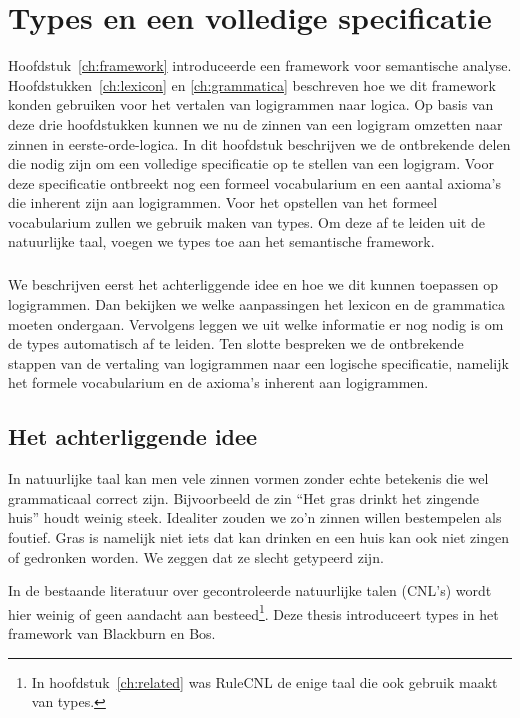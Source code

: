 \chapter{Types en een volledige specificatie}
\label{ch:types}

Hoofdstuk~\ref{ch:framework} introduceerde een framework voor semantische analyse. Hoofdstukken~\ref{ch:lexicon} en \ref{ch:grammatica} beschreven hoe we dit framework konden gebruiken voor het vertalen van logigrammen naar logica. Op basis van deze drie hoofdstukken kunnen we nu de zinnen van een logigram omzetten naar zinnen in eerste-orde-logica. In dit hoofdstuk beschrijven we de ontbrekende delen die nodig zijn om een volledige specificatie op te stellen van een logigram. Voor deze specificatie ontbreekt nog een formeel vocabularium en een aantal axioma's die inherent zijn aan logigrammen. Voor het opstellen van het formeel vocabularium zullen we gebruik maken van types. Om deze af te leiden uit de natuurlijke taal, voegen we types toe aan het semantische framework.

\paragraph{} We beschrijven eerst het achterliggende idee en hoe we dit kunnen toepassen op logigrammen. Dan bekijken we welke aanpassingen het lexicon en de grammatica moeten ondergaan. Vervolgens leggen we uit welke informatie er nog nodig is om de types automatisch af te leiden. Ten slotte bespreken we de ontbrekende stappen van de vertaling van logigrammen naar een logische specificatie, namelijk het formele vocabularium en de axioma's inherent aan logigrammen.

\section{Het achterliggende idee}
In natuurlijke taal kan men vele zinnen vormen zonder echte betekenis die wel grammaticaal correct zijn. Bijvoorbeeld de zin ``Het gras drinkt het zingende huis'' houdt weinig steek. Idealiter zouden we zo'n zinnen willen bestempelen als foutief. Gras is namelijk niet iets dat kan drinken en een huis kan ook niet zingen of gedronken worden. We zeggen dat ze slecht getypeerd zijn.

In de bestaande literatuur over gecontroleerde natuurlijke talen (CNL's) wordt hier weinig of geen aandacht aan besteed\footnote{In hoofdstuk~\ref{ch:related} was RuleCNL de enige taal die ook gebruik maakt van types.}. Deze thesis introduceert types in het framework van Blackburn en Bos. 

